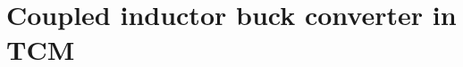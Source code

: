 \documentclass{IPEC2026}
\newcommand{\acp}{\glspl}
\begin{document}




\section{Coupled inductor buck converter in TCM}
\end{document}
